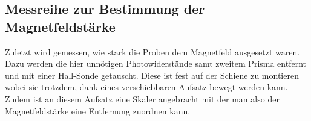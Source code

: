 \subsection{Messreihe zur Bestimmung der Magnetfeldstärke}
Zuletzt wird gemessen, wie stark die Proben dem Magnetfeld ausgesetzt waren. 
Dazu werden die hier unnötigen Photowiderstände samt zweitem Prisma entfernt und mit einer Hall-Sonde 
getauscht. Diese ist fest auf der Schiene zu montieren wobei sie trotzdem, dank eines verschiebbaren 
Aufsatz bewegt werden kann. Zudem ist an diesem Aufsatz eine Skaler angebracht mit der man also der Magnetfeldstärke
eine Entfernung zuordnen kann.

